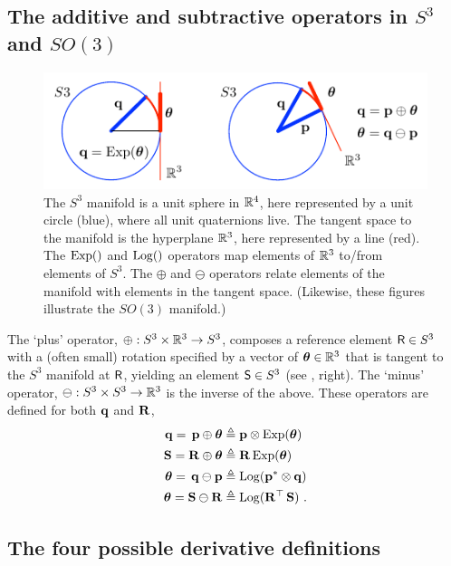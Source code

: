 \subsection{The additive and subtractive operators in $S^3$ and $SO(3)$}

\begin{figure}[tb]
\centering
\includegraphics[scale=1.7]{figures/manifold.pdf}
\caption{The $S^3$ manifold is a unit sphere in ${\mathbb R}^4$, here represented by a unit circle (blue),  where all unit quaternions live. The tangent space to the manifold is the hyperplane ${\mathbb R}^3$, here represented by a line (red). The $\operatorname*{Exp}()$ and $\operatorname*{Log}()$ operators map elements of ${\mathbb R}^3$ to/from elements of $S^3$. The $\oplus$ and $\ominus$ operators relate elements of the manifold with elements in the tangent space. (Likewise, these figures illustrate the $SO(3)$ manifold.)}
\label{fig:manifold}
\end{figure}




The `plus' operator, $\oplus:S^3\times{\mathbb R}^3\to S^3$, composes a reference element $\mathsf R\in S^3$ with a (often small) rotation specified by a vector of ${{\bm \theta}}\in{\mathbb R}^3$ that is tangent to the $S^3$ manifold at $\mathsf R$, yielding an element $\mathsf S\in S^3$ (see , right). 
The `minus' operator, $\ominus:S^3\times S^3\to{\mathbb R}^3$ is the inverse of the above.
These operators are defined for both ${\bf q}$ and ${\bf R}$,
%
\begin{align}
{\bf q} =\, {\bf p}\oplus{{\bm \theta}}  &\triangleq {\bf p}\otimes\operatorname*{Exp}({{\bm \theta}}) \label{equ:plus_q} \\
{\bf S} = {\bf R}\oplus {{\bm \theta}} &\triangleq {\bf R}\operatorname*{Exp}({{\bm \theta}}) \label{equ:plus_R} \\
{{\bm \theta}} =\, {\bf q}\ominus{\bf p} &\triangleq \operatorname*{Log}({\bf p}^*\otimes{\bf q}) \label{equ:minus_q}\\
{{\bm \theta}} = {\bf S}\ominus{\bf R} &\triangleq \operatorname*{Log}({\bf R}^{\top}\,{\bf S})  \label{equ:minus_R}
~.
\end{align}


\subsection{The four possible derivative definitions}

